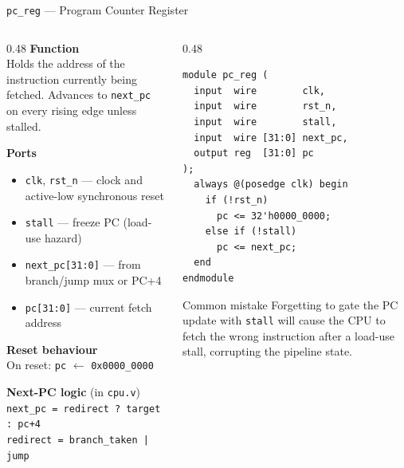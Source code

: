 \documentclass[aspectratio=169,10pt]{beamer}
\begin{document}
\begin{frame}[fragile]{\texttt{pc\_reg} --- Program Counter Register}
  \begin{columns}[T]
    \begin{column}{0.48\textwidth}
      \textbf{Function}\\
      Holds the address of the instruction currently being fetched.
      Advances to \texttt{next\_pc} on every rising edge unless stalled.

      \vspace{0.6em}
      \textbf{Ports}
      \begin{itemize}\small
        \item \texttt{clk}, \texttt{rst\_n} --- clock and active-low synchronous reset
        \item \texttt{stall} --- freeze PC (load-use hazard)
        \item \texttt{next\_pc[31:0]} --- from branch/jump mux or PC+4
        \item \texttt{pc[31:0]} --- current fetch address
      \end{itemize}

      \vspace{0.6em}
      \textbf{Reset behaviour}\\
      On reset: \texttt{pc} $\leftarrow$ \texttt{0x0000\_0000}

      \vspace{0.6em}
      \textbf{Next-PC logic} (in \texttt{cpu.v})\\
      \texttt{next\_pc = redirect ? target : pc+4}\\
      \texttt{redirect = branch\_taken | jump}
    \end{column}
    \begin{column}{0.48\textwidth}
\begin{lstlisting}
module pc_reg (
  input  wire        clk,
  input  wire        rst_n,
  input  wire        stall,
  input  wire [31:0] next_pc,
  output reg  [31:0] pc
);
  always @(posedge clk) begin
    if (!rst_n)
      pc <= 32'h0000_0000;
    else if (!stall)
      pc <= next_pc;
  end
endmodule
\end{lstlisting}
      \vspace{0.4em}
      \begin{alertblock}{Common mistake}
        \small
        Forgetting to gate the PC update with \texttt{stall} will cause the CPU to fetch the wrong instruction after a load-use stall, corrupting the pipeline state.
      \end{alertblock}
    \end{column}
  \end{columns}
\end{frame}
\end{document}
